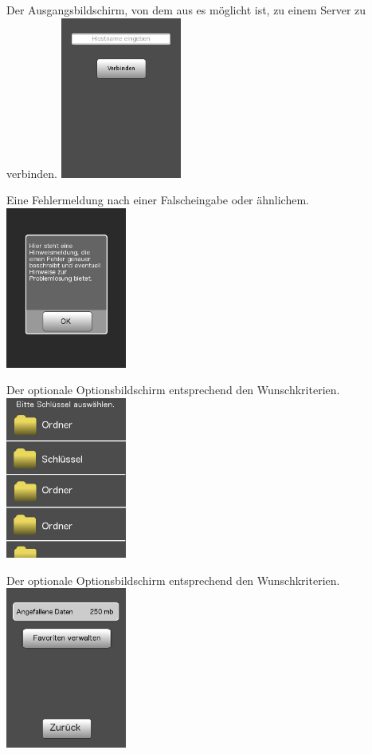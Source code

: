 \documentclass[a4paper,10pt]{scrartcl}
\begin{document}
\begin{illustration}{Der Ausgangsbildschirm, von dem aus es möglicht ist, zu einem Server zu verbinden.}
\includegraphics[width=150px]{figures/images/homescreen.jpg}
\end{illustration}
\begin{illustration}{Eine Fehlermeldung nach einer Falscheingabe oder ähnlichem.}
\includegraphics[width=150px]{figures/images/alert.jpg}
\end{illustration}
\begin{illustration}{Der optionale Optionsbildschirm entsprechend den Wunschkriterien.}
\includegraphics[width=150px]{figures/images/filebrowser.jpg}
\end{illustration}
\begin{illustration}{Der optionale Optionsbildschirm entsprechend den Wunschkriterien.}
\includegraphics[width=150px]{figures/images/optionscreen.jpg}
\end{illustration}
\end{document}
